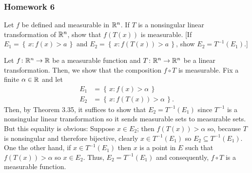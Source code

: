\subsubsection{Homework 6}
\setcounter{exercise}{0}
\setcounter{equation}{0}

\begin{problem}
  Let \(f\) be defined and measurable in \(\mathbb{R}^n\). If \(T\) is a
  nonsingular linear transformation of \(\mathbb{R}^n\), show that \(f(T(x))\) is
  measurable. [If \(E_1=\left\{\,x: f(x)>a\,\right\}\) and
  \(E_2=\left\{\,x:f(T(x))>a\,\right\}\), show \(E_2=T^{-1}(E_1)\).]
\end{problem}
\begin{solution}
  Let \(f\colon\mathbb{R}^n\to\mathbb{R}\) be a measurable function and
  \(T\colon\mathbb{R}^n\to\mathbb{R}^n\) be a linear transformation. Then, we show that
  the composition \(f\circ T\) is measurable. Fix a finite
  \(\alpha\in\mathbb{R}\) and let
  \begin{align*}
    E_1&=\left\{\,x:f(x)>\alpha\,\right\}\\
    E_2&=\left\{\,x:f(T(x))>\alpha\,\right\}.
  \end{align*}
  Then, by Theorem 3.35, it suffices to show that \(E_2=T^{-1}(E_1)\) since
  \(T^{-1}\) is a nonsingular linear transformation so it sends measurable
  sets to measurable sets. But this equality is obvious: Suppose
  \(x\in E_2\); then \(f(T(x))>\alpha\) so, because \(T\) is nonsingular
  and therefore bijective, clearly \(x\in T^{-1}(E_1)\) so
  \(E_2\subseteq T^{-1}(E_1)\). One the other hand, if \(x\in T^{-1}(E_1)\)
  then \(x\) is a point in \(E\) such that \(f(T(x))>\alpha\) so
  \(x\in E_2\). Thus, \(E_2=T^{-1}(E_1)\) and consequently, \(f\circ T\) is
  a measurable function.
\end{solution}

